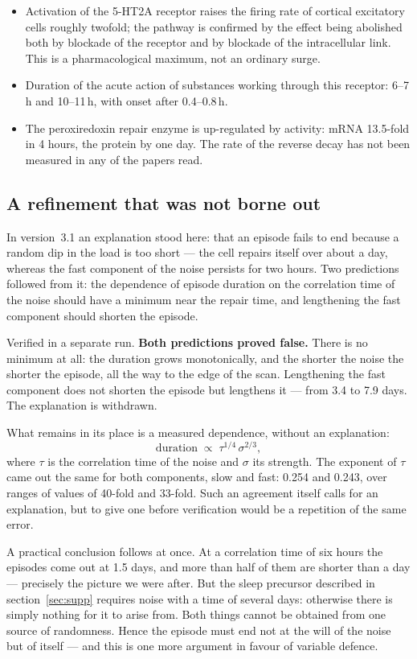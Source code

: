 \facts
\begin{itemize}
\item Activation of the 5-HT2A receptor raises the firing rate of cortical excitatory cells roughly twofold; the pathway is confirmed by the effect being abolished both by blockade of the receptor and by blockade of the intracellular link. This is a pharmacological maximum, not an ordinary surge.\tP
\item Duration of the acute action of substances working through this receptor: 6--7\,h and 10--11\,h, with onset after 0.4--0.8\,h.\tP
\item The peroxiredoxin repair enzyme is up-regulated by activity: mRNA 13.5-fold in 4 hours, the protein by one day. The rate of the reverse decay has not been measured in any of the papers read.\tS
\end{itemize}

\subsection{A refinement that was not borne out}
In version~3.1 an explanation stood here: that an episode fails to end because a random dip in the load is too short --- the cell repairs itself over about a day, whereas the fast component of the noise persists for two hours. Two predictions followed from it: the dependence of episode duration on the correlation time of the noise should have a minimum near the repair time, and lengthening the fast component should shorten the episode.

Verified in a separate run. \textbf{Both predictions proved false.} There is no minimum at all: the duration grows monotonically, and the shorter the noise the shorter the episode, all the way to the edge of the scan. Lengthening the fast component does not shorten the episode but lengthens it --- from 3.4 to 7.9 days. The explanation is withdrawn.

What remains in its place is a measured dependence, without an explanation:
\[\text{duration} \;\propto\; \tau^{1/4}\,\sigma^{2/3},\]
where $\tau$ is the correlation time of the noise and $\sigma$ its strength. The exponent of $\tau$ came out the same for both components, slow and fast: 0.254 and 0.243, over ranges of values of 40-fold and 33-fold. Such an agreement itself calls for an explanation, but to give one before verification would be a repetition of the same error.

A practical conclusion follows at once. At a correlation time of six hours the episodes come out at 1.5 days, and more than half of them are shorter than a day --- precisely the picture we were after. But the sleep precursor described in section~\ref{sec:supp} requires noise with a time of several days: otherwise there is simply nothing for it to arise from. Both things cannot be obtained from one source of randomness. Hence the episode must end not at the will of the noise but of itself --- and this is one more argument in favour of variable defence.

